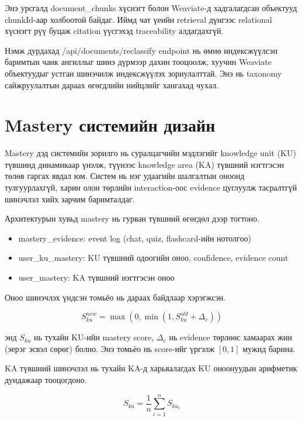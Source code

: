 \documentclass[12pt,A4]{report}
\newcommand{\eng}[1]{#1}
\begin{document}
Энэ урсгалд \eng{document\_chunks} хүснэгт болон Weaviate-д хадгалагдсан объектууд \eng{chunkId}-аар холбоотой байдаг. Иймд чат үеийн retrieval дүнгээс relational хүснэгт рүү буцаж citation үүсгэхэд \eng{traceability} алдагдахгүй.

Нэмж дурдахад \eng{/api/documents/reclassify} endpoint нь өмнө индексжүүлсэн баримтын чанк ангиллыг шинэ дүрмээр дахин тооцоолж, хуучин Weaviate объектуудыг устган шинэчилж индексжүүлэх зориулалттай. Энэ нь taxonomy сайжруулалтын дараах өгөгдлийн нийцлийг хангахад чухал.

\section{Mastery системийн дизайн}

Mastery дэд системийн зорилго нь суралцагчийн мэдлэгийг \eng{knowledge unit (KU)} түвшинд динамикаар үнэлж, түүнээс \eng{knowledge area (KA)} түвшний нэгтгэсэн төлөв гаргах явдал юм. Систем нь нэг удаагийн шалгалтын оноонд тулгуурлахгүй, харин олон төрлийн interaction-оос evidence цуглуулж тасралтгүй шинэчлэл хийх зарчим баримталдаг.

Архитектурын хувьд mastery нь гурван түвшний өгөгдөл дээр тогтоно.

\begin{itemize}
    \item \eng{mastery\_evidence}: event log (chat, quiz, flashcard-ийн нотолгоо)
    \item \eng{user\_ku\_mastery}: KU түвшний одоогийн оноо, confidence, evidence count
    \item \eng{user\_mastery}: KA түвшний нэгтгэсэн оноо
\end{itemize}

Оноо шинэчлэх үндсэн томьёо нь дараах байдлаар хэрэгжсэн.

\begin{equation}
S_{ku}^{new}=\max\left(0,\min\left(1, S_{ku}^{old}+\Delta_e\right)\right)
\end{equation}

энд $S_{ku}$ нь тухайн KU-ийн mastery score, $\Delta_e$ нь evidence төрлөөс хамаарах жин (эерэг эсвэл сөрөг) болно. Энэ томьёо нь score-ийг үргэлж $[0,1]$ мужид барина.

KA түвшний шинэчлэл нь тухайн KA-д харьяалагдах KU оноонуудын арифметик дундажаар тооцогдоно.

\begin{equation}
S_{ka}=\frac{1}{n}\sum_{i=1}^{n} S_{ku_i}
\end{equation}
\end{document}
